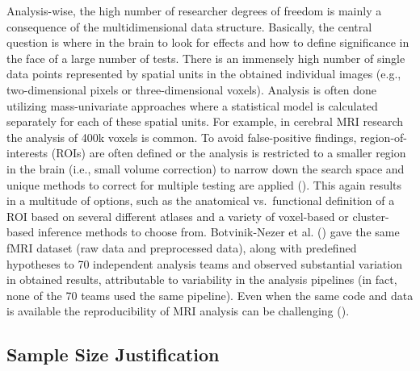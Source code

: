 \documentclass[
  letterpaper,
  DIV=11,
  openany,
  fontsize=12pt,
  parskip=half,
  headings=big,
  numbers=noenddot,
  titlepage=false]{scrreprt}
\begin{document}
Analysis-wise, the high number of researcher degrees of freedom is
mainly a consequence of the multidimensional data structure. Basically,
the central question is where in the brain to look for effects and how
to define significance in the face of a large number of tests. There is
an immensely high number of single data points represented by spatial
units in the obtained individual images (e.g., two-dimensional pixels or
three-dimensional voxels). Analysis is often done utilizing
mass-univariate approaches where a statistical model is calculated
separately for each of these spatial units. For example, in cerebral MRI
research the analysis of 400k voxels is common. To avoid false-positive
findings, region-of-interests (ROIs) are often defined or the analysis
is restricted to a smaller region in the brain (i.e., small volume
correction) to narrow down the search space and unique methods to
correct for multiple testing are applied
(). This again
results in a multitude of options, such as the anatomical vs.~functional
definition of a ROI based on several different atlases and a variety of
voxel-based or cluster-based inference methods to choose from.
Botvinik-Nezer et al. () gave
the same fMRI dataset (raw data and preprocessed data), along with
predefined hypotheses to 70 independent analysis teams and observed
substantial variation in obtained results, attributable to variability
in the analysis pipelines (in fact, none of the 70 teams used the same
pipeline). Even when the same code and data is available the
reproducibility of MRI analysis can be challenging
().

\subsection{Sample Size Justification}\label{sample-size-justification}
\end{document}
